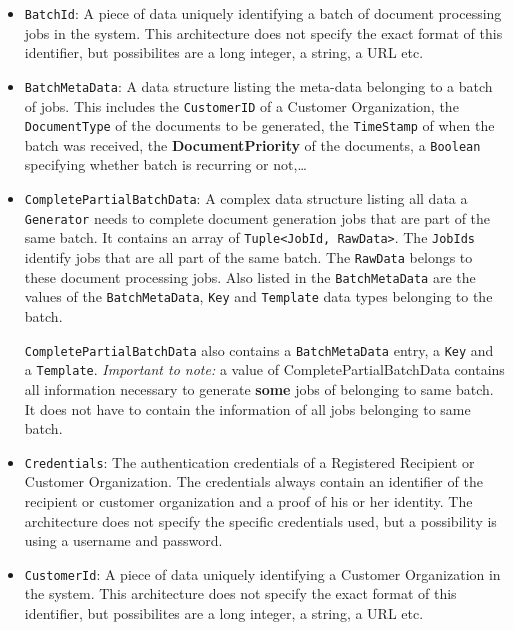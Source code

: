 \documentclass[a4paper,10pt]{article}
\begin{document}
\begin{itemize}
	\item \texttt{BatchId}: A piece of data uniquely identifying a batch of document processing jobs in the system. This architecture does not specify the exact format of this identifier, but possibilites are a long integer, a string, a URL etc.
	
	\item \texttt{BatchMetaData}: A data structure listing the meta-data belonging to a batch of jobs. This includes the \texttt{CustomerID} of a Customer Organization, the \texttt{DocumentType} of the documents to be generated, the \texttt{TimeStamp} of when the batch was received, the \textbf{DocumentPriority} of the documents, a \texttt{Boolean} specifying whether batch is recurring or not,\dots
	

	\item \texttt{CompletePartialBatchData}: A complex data structure listing all data a \texttt{Generator} needs to complete document generation jobs that are part of the same batch. It contains an array of \texttt{Tuple<JobId, RawData>}. The \texttt{JobIds} identify jobs that are all part of the same batch. The \texttt{RawData} belongs to these document processing jobs. Also listed in the \texttt{BatchMetaData} are the values of the \texttt{BatchMetaData}, \texttt{Key} and \texttt{Template} data types belonging to the batch.	
	
	 \texttt{CompletePartialBatchData} also contains a \texttt{BatchMetaData} entry, a \texttt{Key} and a \texttt{Template}. \emph{Important to note:} a value of CompletePartialBatchData contains all information necessary to generate \textbf{some} jobs of belonging to same batch. It does not have to contain the information of all jobs belonging to same batch.

	\item \texttt{Credentials}: The authentication credentials of a Registered Recipient or Customer Organization. The credentials always contain an identifier of the recipient or customer organization and a proof of his or her identity. The architecture does not specify the specific credentials used, but a possibility is using a username and password.
	 
	\item \texttt{CustomerId}: A piece of data uniquely identifying a Customer Organization in the system. This architecture does not specify the exact format of this identifier, but possibilites are a long integer, a string, a URL etc.
	

\end{itemize}
\end{document}
